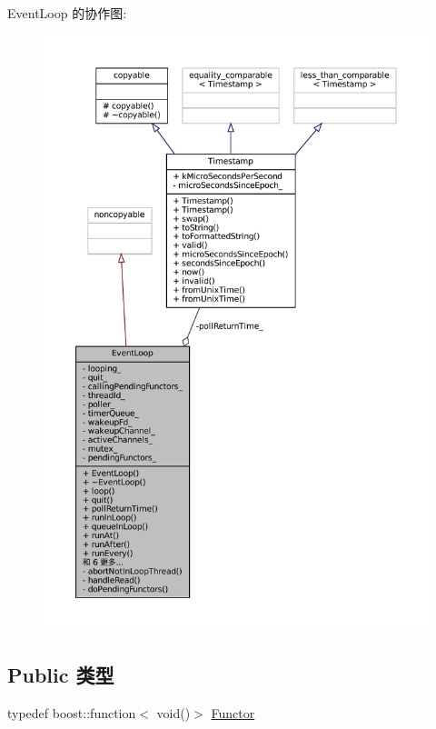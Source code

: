 Event\+Loop 的协作图\+:
\nopagebreak
\begin{figure}[H]
\begin{center}
\leavevmode
\includegraphics[width=350pt]{classmuduo_1_1EventLoop__coll__graph}
\end{center}
\end{figure}
\subsection*{Public 类型}
\begin{DoxyCompactItemize}
\item 
typedef boost\+::function$<$ void()$>$ \hyperlink{classmuduo_1_1EventLoop_aa47556388c5bf0b2534c9816841d8e7a}{Functor}
\end{DoxyCompactItemize}

